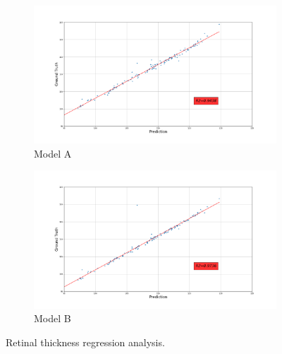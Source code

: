 \documentclass[12pt,a4paper]{scrartcl}
\begin{document}
\begin{figure}[H]
\centering
\begin{subfigure}{1\textwidth}
  \centering
  \includegraphics[width=\linewidth]{./results/model_A_retinal_thickness.png}
  \caption{Model A}
  \label{fig:model_a_retinal_thickness}
\end{subfigure}
\begin{subfigure}{1\textwidth}
  \centering
  \includegraphics[width=\linewidth]{./results/model_B_retinal_thickness.png}
  \caption{Model B}
  \label{fig:model_b_retinal_thickness}
\end{subfigure}
\caption{Retinal thickness regression analysis.}
\label{fig:retinal_thickness_scatterplots}
\end{figure}
\end{document}
